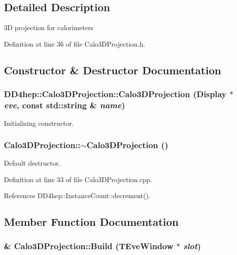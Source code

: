 \subsection{Detailed Description}
3D projection for calorimeters 

Definition at line 36 of file Calo3DProjection.h.

\subsection{Constructor \& Destructor Documentation}
\hypertarget{class_d_d4hep_1_1_calo3_d_projection_a919a663da0171fe6025081f6daa5cf23}{
\subsubsection[{Calo3DProjection}]{\setlength{\rightskip}{0pt plus 5cm}DD4hep::Calo3DProjection::Calo3DProjection ({\bf Display} $\ast$ {\em eve}, \/  const std::string \& {\em name})}}
\label{class_d_d4hep_1_1_calo3_d_projection_a919a663da0171fe6025081f6daa5cf23}


Initializing constructor. \hypertarget{class_d_d4hep_1_1_calo3_d_projection_a21d41d0b38ff49b6e51f7d780a82351c}{
\subsubsection[{$\sim$Calo3DProjection}]{\setlength{\rightskip}{0pt plus 5cm}Calo3DProjection::$\sim$Calo3DProjection ()}}
\label{class_d_d4hep_1_1_calo3_d_projection_a21d41d0b38ff49b6e51f7d780a82351c}


Default destructor. 

Definition at line 33 of file Calo3DProjection.cpp.

References DD4hep::InstanceCount::decrement().

\subsection{Member Function Documentation}
\hypertarget{class_d_d4hep_1_1_calo3_d_projection_a2f0865f08b8eedfc84323b8a280d1216}{
\subsubsection[{Build}]{ \& Calo3DProjection::Build (TEveWindow $\ast$ {\em slot})}}
\label{class_d_d4hep_1_1_calo3_d_projection_a2f0865f08b8eedfc84323b8a280d1216}


